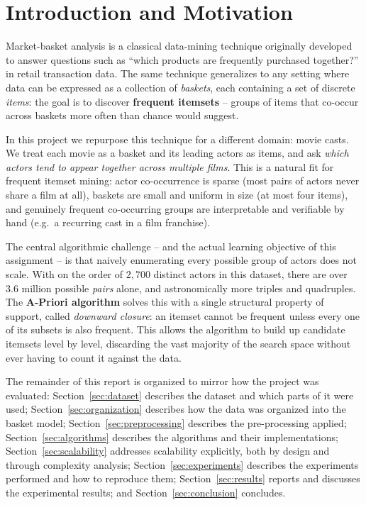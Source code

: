 \documentclass[11pt,a4paper]{article}
\begin{document}
\tableofcontents

\section{Introduction and Motivation}

Market-basket analysis is a classical data-mining technique originally
developed to answer questions such as ``which products are frequently
purchased together?'' in retail transaction data. The same technique
generalizes to any setting where data can be expressed as a collection of
\emph{baskets}, each containing a set of discrete \emph{items}: the goal is to
discover \textbf{frequent itemsets} -- groups of items that co-occur across
baskets more often than chance would suggest.

In this project we repurpose this technique for a different domain: movie
casts. We treat each movie as a basket and its leading actors as items, and
ask \emph{which actors tend to appear together across multiple films}. This is
a natural fit for frequent itemset mining: actor co-occurrence is sparse (most
pairs of actors never share a film at all), baskets are small and uniform in
size (at most four items), and genuinely frequent co-occurring groups are
interpretable and verifiable by hand (e.g.\ a recurring cast in a film
franchise).

The central algorithmic challenge -- and the actual learning objective of this
assignment -- is that naively enumerating every possible group of actors does
not scale. With on the order of $2{,}700$ distinct actors in this dataset,
there are over $3.6$ million possible \emph{pairs} alone, and astronomically
more triples and quadruples. The \textbf{A-Priori algorithm} solves this with
a single structural property of support, called \emph{downward closure}: an
itemset cannot be frequent unless every one of its subsets is also frequent.
This allows the algorithm to build up candidate itemsets level by level,
discarding the vast majority of the search space without ever having to count
it against the data.

The remainder of this report is organized to mirror how the project was
evaluated: Section~\ref{sec:dataset} describes the dataset and which parts of
it were used; Section~\ref{sec:organization} describes how the data was
organized into the basket model; Section~\ref{sec:preprocessing} describes the
pre-processing applied; Section~\ref{sec:algorithms} describes the algorithms
and their implementations; Section~\ref{sec:scalability} addresses scalability
explicitly, both by design and through complexity analysis;
Section~\ref{sec:experiments} describes the experiments performed and how to
reproduce them; Section~\ref{sec:results} reports and discusses the
experimental results; and Section~\ref{sec:conclusion} concludes.
\end{document}
